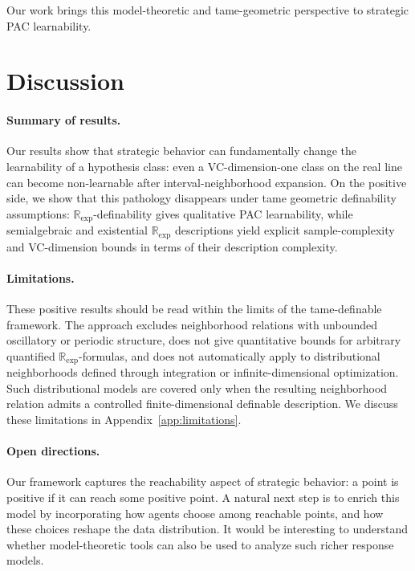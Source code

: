\documentclass[11pt]{article}
\theoremstyle{plain}
\theoremstyle{definition}
\theoremstyle{remark}
\newcommand{\R}{\mathbb{R}}
\begin{document}
Our work brings this model-theoretic and tame-geometric perspective to strategic PAC learnability.


\section{Discussion} 
\label{sec:discussion}


\paragraph{Summary of results.}
Our results show that strategic behavior can fundamentally change the
learnability of a hypothesis class: even a VC-dimension-one class on the real
line can become non-learnable after interval-neighborhood expansion. On the
positive side, we show that this pathology disappears under tame geometric
definability assumptions: \(\R_{\exp}\)-definability gives qualitative PAC
learnability, while semialgebraic and existential \(\R_{\exp}\) descriptions
yield explicit sample-complexity and VC-dimension bounds in terms of their
description complexity.

\paragraph{Limitations.}
These positive results should be read within the limits of the tame-definable
framework. The approach excludes neighborhood relations with unbounded
oscillatory or periodic structure, does not give quantitative bounds for
arbitrary quantified \(\R_{\exp}\)-formulas, and does not automatically apply to
distributional neighborhoods defined through integration or infinite-dimensional
optimization. Such distributional models are covered only when the resulting
neighborhood relation admits a controlled finite-dimensional definable
description. We discuss these limitations in
Appendix~\ref{app:limitations}.

\paragraph{Open directions.}
Our framework captures the reachability aspect of strategic behavior: a point is
positive if it can reach some positive point. A natural next step is to enrich
this model by incorporating how agents choose among reachable points, and how
these choices reshape the data distribution. It would be interesting to
understand whether model-theoretic tools can also be used to analyze such richer
response models.
\end{document}
